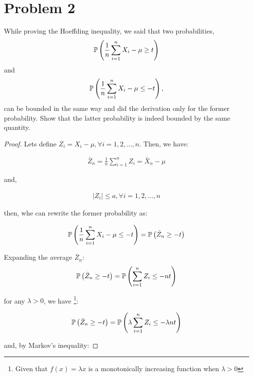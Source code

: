 \section*{Problem 2}
\begin{myanswerbox}
While proving the Hoeffding inequality, we said that two probabilities,
\[
    \mathbb{P}\left(\frac{1}{n} \sum_{i=1}^{n} X_i - \mu \geq t \right)
\]
and
\[ 
    \mathbb{P}\left(\frac{1}{n} \sum_{i=1}^{n} X_i - \mu \leq -t \right),
\]
can be bounded in the same way and did the derivation only for the former probability. Show that the latter probability is indeed bounded by the same quantity.
\end{myanswerbox}

\begin{proof}
    Lets define $Z_i = X_i - \mu, \forall i = 1, 2, \dots, n$. Then, we have:
    
    \begin{align*}
    \bar{Z}_n = \frac{1}{n} \sum_{i=1}^n Z_i = \bar{X}_n - \mu
    \end{align*}
    
    and,
    
    \begin{align*}
    |Z_i| \leq a, \forall i = 1, 2, \dots , n
    \end{align*}
    
    then, whe can rewrite the former probability as:
    
    \begin{align*}
    \mathbb{P}\left(\frac{1}{n} \sum_{i=1}^{n} X_i - \mu \leq -t \right) = \mathbb{P}\left(\bar{Z}_n \geq -t\right)
    \end{align*}
    
    Expanding the average $\bar{Z}_n$:
    \begin{align*}
    \mathbb{P}\left(\bar{Z}_n \geq -t\right) = \mathbb{P}\left(\sum_{i=1}^n Z_i \leq -nt\right)
    \end{align*}
    
    for any $\lambda > 0$, we have \footnote{Given that $f(x) = \lambda x$ is a monotonically increasing function when $\lambda > 0$}:
    
    \begin{align*}
    \mathbb{P}\left(\bar{Z}_n \geq -t\right) = 
    \mathbb{P}\left(\lambda \sum_{i=1}^n Z_i \leq -\lambda nt\right)\\
    \end{align*}
    
    and, by Markov's inequality:
    

\end{proof}
